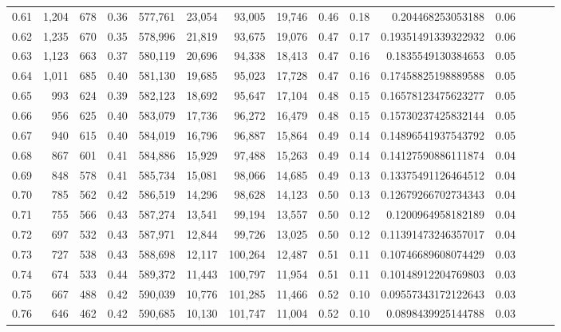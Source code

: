 \begin{tabular}{rrrrrrrrrrrrrrr}
0.61 &   1,204 &    678 &  0.36 &  577,761 &   23,054 &   93,005 &   19,746 &  0.46 &  0.18 &     0.204468253053188 &      0.06 \\
0.62 &   1,235 &    670 &  0.35 &  578,996 &   21,819 &   93,675 &   19,076 &  0.47 &  0.17 &   0.19351491339322932 &      0.06 \\
0.63 &   1,123 &    663 &  0.37 &  580,119 &   20,696 &   94,338 &   18,413 &  0.47 &  0.16 &    0.1835549130384653 &      0.05 \\
0.64 &   1,011 &    685 &  0.40 &  581,130 &   19,685 &   95,023 &   17,728 &  0.47 &  0.16 &   0.17458825198889588 &      0.05 \\
0.65 &     993 &    624 &  0.39 &  582,123 &   18,692 &   95,647 &   17,104 &  0.48 &  0.15 &   0.16578123475623277 &      0.05 \\
0.66 &     956 &    625 &  0.40 &  583,079 &   17,736 &   96,272 &   16,479 &  0.48 &  0.15 &   0.15730237425832144 &      0.05 \\
0.67 &     940 &    615 &  0.40 &  584,019 &   16,796 &   96,887 &   15,864 &  0.49 &  0.14 &   0.14896541937543792 &      0.05 \\
0.68 &     867 &    601 &  0.41 &  584,886 &   15,929 &   97,488 &   15,263 &  0.49 &  0.14 &   0.14127590886111874 &      0.04 \\
0.69 &     848 &    578 &  0.41 &  585,734 &   15,081 &   98,066 &   14,685 &  0.49 &  0.13 &   0.13375491126464512 &      0.04 \\
0.70 &     785 &    562 &  0.42 &  586,519 &   14,296 &   98,628 &   14,123 &  0.50 &  0.13 &   0.12679266702734343 &      0.04 \\
0.71 &     755 &    566 &  0.43 &  587,274 &   13,541 &   99,194 &   13,557 &  0.50 &  0.12 &    0.1200964958182189 &      0.04 \\
0.72 &     697 &    532 &  0.43 &  587,971 &   12,844 &   99,726 &   13,025 &  0.50 &  0.12 &   0.11391473246357017 &      0.04 \\
0.73 &     727 &    538 &  0.43 &  588,698 &   12,117 &  100,264 &   12,487 &  0.51 &  0.11 &   0.10746689608074429 &      0.03 \\
0.74 &     674 &    533 &  0.44 &  589,372 &   11,443 &  100,797 &   11,954 &  0.51 &  0.11 &   0.10148912204769803 &      0.03 \\
0.75 &     667 &    488 &  0.42 &  590,039 &   10,776 &  101,285 &   11,466 &  0.52 &  0.10 &   0.09557343172122643 &      0.03 \\
0.76 &     646 &    462 &  0.42 &  590,685 &   10,130 &  101,747 &   11,004 &  0.52 &  0.10 &    0.0898439925144788 &      0.03 \\

\end{tabular}
